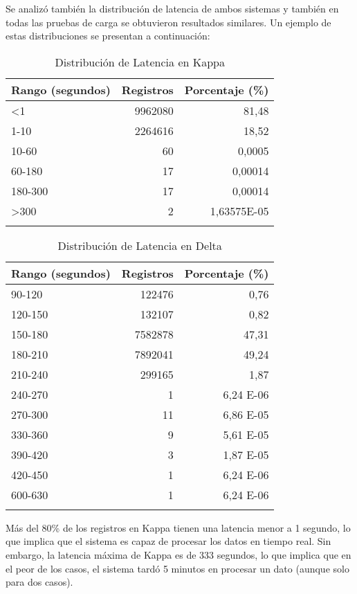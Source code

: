 Se analizó también la distribución de latencia de ambos sistemas y también en todas las pruebas de carga se obtuvieron resultados similares.
Un ejemplo de estas distribuciones se presentan a continuación:

\begin{longtable}{|l|r|r|}
    \hline
    \textbf{Rango (segundos)} & \textbf{Registros} & \textbf{Porcentaje (\%)} \\
    \hline
    \endhead
    <1 & 9962080 & 81,48 \\
    \hline
    1-10 & 2264616 & 18,52 \\
    \hline
    10-60 & 60 & 0,0005 \\
    \hline
    60-180 & 17 & 0,00014 \\
    \hline
    180-300 & 17 & 0,00014 \\
    \hline
    >300 & 2 & 1,63575E-05 \\
    \hline
    \caption{Distribución de Latencia en Kappa} \\
\end{longtable}

\newpage

\begin{longtable}{|l|r|r|}
    \hline
    \textbf{Rango (segundos)} & \textbf{Registros} & \textbf{Porcentaje (\%)} \\
    \hline
    \endhead
    90-120 & 122476 & 0,76 \\
    \hline
    120-150 & 132107 & 0,82 \\
    \hline
    150-180 & 7582878 & 47,31 \\
    \hline
    180-210 & 7892041 & 49,24 \\
    \hline
    210-240 & 299165 & 1,87 \\
    \hline
    240-270 & 1 & 6,24 E-06 \\
    \hline
    270-300 & 11 & 6,86 E-05 \\
    \hline
    330-360 & 9 & 5,61 E-05 \\
    \hline
    390-420 & 3 & 1,87 E-05 \\
    \hline
    420-450 & 1 & 6,24 E-06 \\
    \hline
    600-630 & 1 & 6,24 E-06 \\
    \hline
    \caption{Distribución de Latencia en Delta} \\
\end{longtable}

Más del 80\% de los registros en Kappa tienen una latencia menor a 1 segundo, lo que implica que el sistema es capaz de procesar los datos en tiempo real.
Sin embargo, la latencia máxima de Kappa es de 333 segundos, lo que implica que en el peor de los casos, el sistema tardó 5 minutos en procesar un dato (aunque solo para dos casos). \newline

